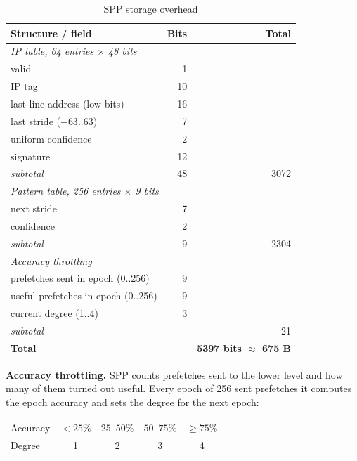 \documentclass[conference]{IEEEtran}
\begin{document}
\begin{table}[t]
\centering
\caption{SPP storage overhead}
\label{tab:storage}
\footnotesize
\begin{tabular}{lrr}
\toprule
Structure / field & Bits & Total \\
\midrule
\multicolumn{3}{l}{\emph{IP table, 64 entries $\times$ 48 bits}} \\
\quad valid & 1 & \\
\quad IP tag & 10 & \\
\quad last line address (low bits) & 16 & \\
\quad last stride ($-63..63$) & 7 & \\
\quad uniform confidence & 2 & \\
\quad signature & 12 & \\
\quad \emph{subtotal} & 48 & 3072 \\
\midrule
\multicolumn{3}{l}{\emph{Pattern table, 256 entries $\times$ 9 bits}} \\
\quad next stride & 7 & \\
\quad confidence & 2 & \\
\quad \emph{subtotal} & 9 & 2304 \\
\midrule
\multicolumn{3}{l}{\emph{Accuracy throttling}} \\
\quad prefetches sent in epoch (0..256) & 9 & \\
\quad useful prefetches in epoch (0..256) & 9 & \\
\quad current degree (1..4) & 3 & \\
\quad \emph{subtotal} & & 21 \\
\midrule
\textbf{Total} & & \textbf{5397 bits $\approx$ 675 B} \\
\bottomrule
\end{tabular}
\end{table}

\textbf{Accuracy throttling.} SPP counts prefetches sent to the lower level
and how many of them turned out useful. Every epoch of 256 sent prefetches it
computes the epoch accuracy and sets the degree for the next epoch:
\begin{center}
\footnotesize
\begin{tabular}{lcccc}
\toprule
Accuracy & $<25\%$ & $25$--$50\%$ & $50$--$75\%$ & $\geq 75\%$ \\
Degree & 1 & 2 & 3 & 4 \\
\bottomrule
\end{tabular}
\end{center}
\end{document}
